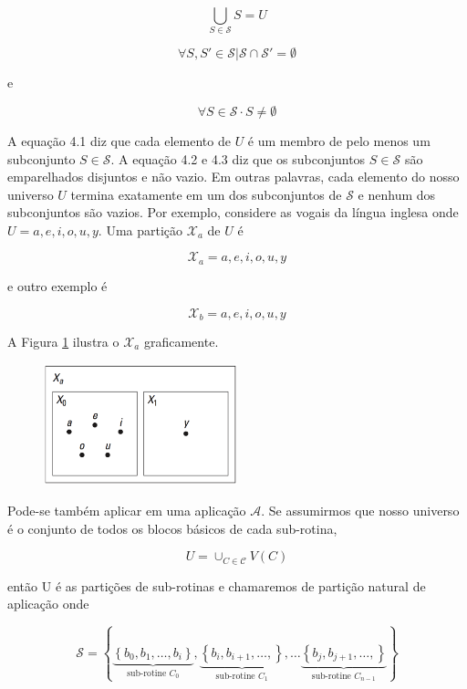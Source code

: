 $$ \bigcup_{S \in \mathcal{S}} S = U $$

$$ \forall S, S' \in \mathcal{S} | \mathcal{S} \cap \mathcal{S}' = \emptyset $$

e

$$ \forall S \in \mathcal{S} \cdot S \neq  \emptyset $$

A equação 4.1 diz que cada elemento de $ U $ é um membro de pelo menos um subconjunto $ S \in \mathcal{S} $. A equação 4.2 e 4.3 diz que os subconjuntos $ S \in \mathcal{S} $ são emparelhados disjuntos e não vazio. Em outras palavras, cada elemento do nosso universo $ U $ termina exatamente em um dos subconjuntos de $ \mathcal{S} $ e nenhum dos subconjuntos são vazios. Por exemplo, considere as vogais da língua inglesa onde $ U = {a, e, i, o, u, y} $. Uma partição $ \mathcal{X}_a $ de $ U $ é

$$ \mathcal{X}_a = {{a, e, i, o, u}, {y}} $$

e outro exemplo é 

$$ \mathcal{X}_b = {{a}, {e}, {i}, {o}, {u}, {y}} $$

A Figura \ref{fig:f4-2} ilustra o $ \mathcal{X}_a $ graficamente.

\begin{figure}[h] \centering
	\includegraphics[width=0.5\textwidth]{img/f4-2.png}
	\caption{}
	\label{fig:f4-2}
\end{figure}

Pode-se também aplicar em uma aplicação $ \mathcal{A} $. Se assumirmos que nosso universo é o conjunto de todos os blocos básicos de cada sub-rotina, 

$$ U = \cup_{C \in \mathcal{C}} V(C) $$

então U é as partições de sub-rotinas e chamaremos de partição natural de aplicação onde

$$
\mathcal{S}  = \left \{  
\underbrace{\left \{ b_0, b_1, \dots, b_i \right \}}_{\text{sub-rotine }C_0},
\underbrace{\left \{ b_i, b_{i+1}, \dots, \right \}}_{\text{sub-rotine }C_1},\dots
\underbrace{\left \{ b_j, b_{j+1}, \dots, \right \}}_{\text{sub-rotine }C_{n-1}}
\right \}
$$

